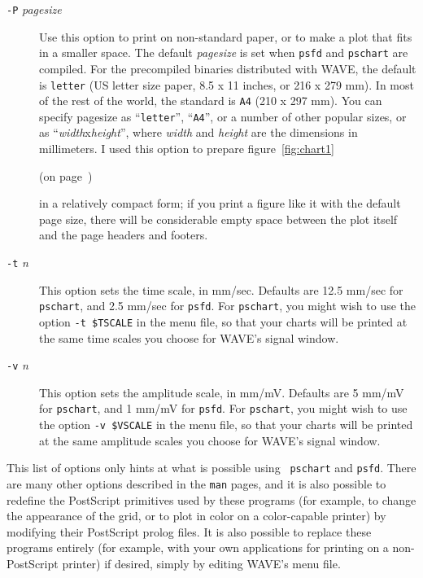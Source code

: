 \documentclass[twoside]{book}
\newcommand{\WAVE}{{\sf WAVE}\xspace}
\begin{document}
\begin{description}
\item[{\tt -P} \textit{pagesize}]
Use this option to print on non-standard paper, or to make a plot that
fits in a smaller space.  The default \textit{pagesize} is set when
{\tt psfd} and {\tt pschart} are compiled.  For the precompiled
binaries distributed with \WAVE{}, the default is {\tt letter} (US
letter size paper, 8.5 x 11 inches, or 216 x 279 mm).  In most of the
rest of the world, the standard is {\tt A4} (210 x 297 mm).  You can
specify pagesize as ``{\tt letter}'', ``{\tt A4}'', or a number of
other popular sizes, or as ``\textit{width}x\textit{height}'', where
\textit{width} and \textit{height} are the dimensions in millimeters.
I used this option to prepare figure~\ref{fig:chart1}
\begin{latexonly}
(on page~\pageref{fig:chart1})
\end{latexonly}
in a relatively compact form; if you print
a figure like it with the default page size, there will be
considerable empty space between the plot itself and the page headers
and footers.

\item[{\tt -t} \textit{n}]
This option sets the time scale, in mm/sec.  Defaults are 12.5 mm/sec
for {\tt pschart}, and 2.5 mm/sec for {\tt psfd}.  For {\tt pschart},
you might wish to use the option {\tt -t \$TSCALE} in the menu
file, so that your charts will be printed at the same time scales you
choose for \WAVE{}'s signal window.

\item[{\tt -v} \textit{n}]
This option sets the amplitude scale, in mm/mV.  Defaults are 5 mm/mV
for {\tt pschart}, and 1 mm/mV for {\tt psfd}.    For {\tt pschart},
you might wish to use the option {\tt -v \$VSCALE} in the menu
file, so that your charts will be printed at the same amplitude scales you
choose for \WAVE{}'s signal window.
\end{description}

This list of options only hints at what is possible using {\tt
pschart} and {\tt psfd}.  There are many other options described in
the {\tt man} pages, and it is also possible to redefine the
PostScript primitives used by these programs (for example, to change
the appearance of the grid, or to plot in color on a color-capable
printer) by modifying their PostScript prolog files.  It is also
possible to replace these programs entirely (for example, with your
own applications for printing on a non-PostScript printer) if desired,
simply by editing \WAVE{}'s menu file.
\end{document}
